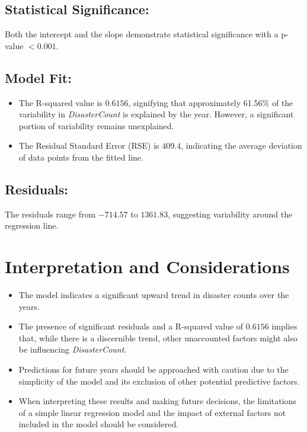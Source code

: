 \documentclass[11pt]{article}\usepackage[]{graphicx}\usepackage[]{xcolor}
\begin{document}
\subsection*{Statistical Significance:}
Both the intercept and the slope demonstrate statistical significance with a p-value $< 0.001$.

\subsection*{Model Fit:}
\begin{itemize}
    \item The R-squared value is $0.6156$, signifying that approximately 61.56\% of the variability in \textit{DisasterCount} is explained by the year. However, a significant portion of variability remains unexplained.
    \item The Residual Standard Error (RSE) is $409.4$, indicating the average deviation of data points from the fitted line.
\end{itemize}

\subsection*{Residuals:}
The residuals range from $-714.57$ to $1361.83$, suggesting variability around the regression line.

\section*{Interpretation and Considerations}
\begin{itemize}
    \item The model indicates a significant upward trend in disaster counts over the years.
    \item The presence of significant residuals and a R-squared value of $0.6156$ implies that, while there is a discernible trend, other unaccounted factors might also be influencing \textit{DisasterCount}.
    \item Predictions for future years should be approached with caution due to the simplicity of the model and its exclusion of other potential predictive factors.
    \item When interpreting these results and making future decisions, the limitations of a simple linear regression model and the impact of external factors not included in the model should be considered.
\end{itemize}
\end{document}
